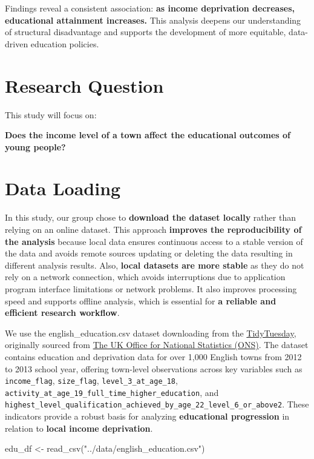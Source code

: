 \documentclass[11pt,en]{../resources/elegantpaper}
\newenvironment{Shaded}{\begin{snugshade}}{\end{snugshade}}
\newcommand{\FunctionTok}[1]{\textcolor[rgb]{0.00,0.00,0.81}{#1}}
\newcommand{\NormalTok}[1]{#1}
\newcommand{\OtherTok}[1]{\textcolor[rgb]{0.50,0.00,0.50}{#1}}
\newcommand{\StringTok}[1]{\textcolor[rgb]{0.31,0.60,0.02}{#1}}
\begin{document}
Findings reveal a consistent association: \textbf{as income deprivation
decreases, educational attainment increases.} This analysis deepens our
understanding of structural disadvantage and supports the development of
more equitable, data-driven education policies.

\section{Research Question}\label{research-question}

This study will focus on:

\textbf{Does the income level of a town affect the educational outcomes
of young people?}

\section{Data Loading}\label{data-loading}

In this study, our group chose to \textbf{download the dataset locally}
rather than relying on an online dataset. This approach \textbf{improves
the reproducibility of the analysis} because local data ensures
continuous access to a stable version of the data and avoids remote
sources updating or deleting the data resulting in different analysis
results. Also, \textbf{local datasets are more stable} as they do not
rely on a network connection, which avoids interruptions due to
application program interface limitations or network problems. It also
improves processing speed and supports offline analysis, which is
essential for \textbf{a reliable and efficient research workflow}.

We use the english\_education.csv dataset downloading from the
\href{https://github.com/rfordatascience/tidytuesday/blob/main/data/2024/2024-01-23/english_education.csv}{TidyTuesday},
originally sourced from \href{https://www.ons.gov.uk/}{The UK Office for
National Statistics (ONS)}. The dataset contains education and
deprivation data for over 1,000 English towns from 2012 to 2013 school
year, offering town-level observations across key variables such as
\texttt{income\_flag}, \texttt{size\_flag},
\texttt{level\_3\_at\_age\_18},
\texttt{activity\_at\_age\_19\_full\_time\_higher\_education}, and
\texttt{highest\_level\_qualification\_achieved\_by\_age\_22\_level\_6\_or\_above2}.
These indicators provide a robust basis for analyzing
\textbf{educational progression} in relation to \textbf{local income
deprivation}.

\begin{Shaded}
\begin{Highlighting}[]
\NormalTok{edu\_df }\OtherTok{\textless{}{-}} \FunctionTok{read\_csv}\NormalTok{(}\StringTok{"../data/english\_education.csv"}\NormalTok{)}
\end{Highlighting}
\end{Shaded}
\end{document}
